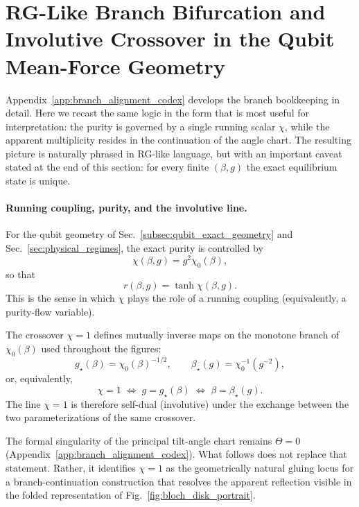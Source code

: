 \section{RG-Like Branch Bifurcation and Involutive Crossover in the Qubit Mean-Force Geometry}
\label{app:branch_bifurcation_involutive}

Appendix~\ref{app:branch_alignment_codex} develops the branch bookkeeping in detail.  Here we recast the same
logic in the form that is most useful for interpretation: the purity is governed by a single running scalar
$\chi$, while the apparent multiplicity resides in the continuation of the angle chart.  The resulting picture
is naturally phrased in RG-like language, but with an important caveat stated at the end of this section: for
every finite $(\beta,g)$ the exact equilibrium state is unique.

\paragraph{Running coupling, purity, and the involutive line.}
For the qubit geometry of Sec.~\ref{subsec:qubit_exact_geometry} and Sec.~\ref{sec:physical_regimes}, the exact
purity is controlled by
\begin{equation}
    \chi(\beta,g)=g^2\chi_0(\beta),
    \label{eq:branch_rg_chi_running}
\end{equation}
so that
\begin{equation}
    r(\beta,g)=\tanh\chi(\beta,g).
    \label{eq:branch_rg_purity_law}
\end{equation}
This is the sense in which $\chi$ plays the role of a running coupling (equivalently, a purity-flow variable).

The crossover $\chi=1$ defines mutually inverse maps on the monotone branch of $\chi_0(\beta)$ used throughout
the figures:
\begin{equation}
    g_\star(\beta)=\chi_0(\beta)^{-1/2},
    \qquad
    \beta_\star(g)=\chi_0^{-1}(g^{-2}),
    \label{eq:branch_rg_inverse_maps}
\end{equation}
or, equivalently,
\begin{equation}
    \chi=1
    \;\Longleftrightarrow\;
    g=g_\star(\beta)
    \;\Longleftrightarrow\;
    \beta=\beta_\star(g).
    \label{eq:branch_rg_chi1_equiv}
\end{equation}
The line $\chi=1$ is therefore self-dual (involutive) under the exchange between the two parameterizations of
the same crossover.

The formal singularity of the principal tilt-angle chart remains $\Theta=0$ (Appendix~\ref{app:branch_alignment_codex}).
What follows does not replace that statement.  Rather, it identifies $\chi=1$ as the geometrically natural
gluing locus for a branch-continuation construction that resolves the apparent reflection visible in the folded
representation of Fig.~\ref{fig:bloch_disk_portrait}.

